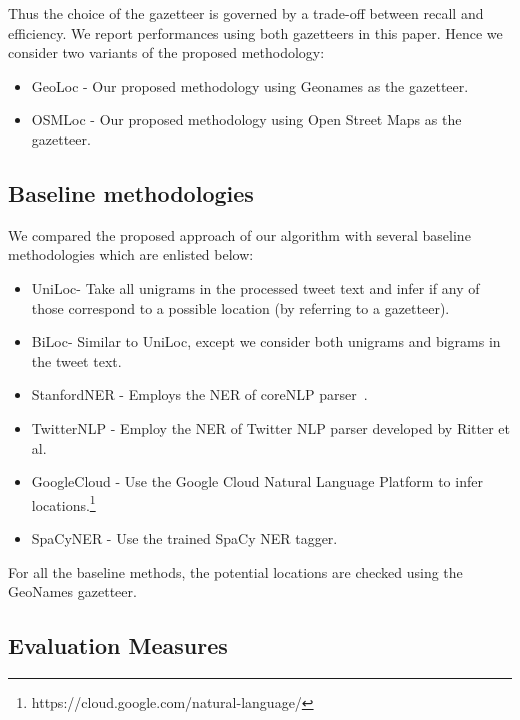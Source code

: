Thus the choice of the gazetteer is governed by a trade-off
between recall and efficiency. 
We report performances using both gazetteers in this paper. Hence we consider two variants of the proposed methodology:
\begin{itemize}
\item GeoLoc - Our proposed methodology using Geonames as the gazetteer. 
\item OSMLoc - Our proposed methodology using Open Street Maps as the gazetteer. 
\end{itemize}



\subsection{Baseline methodologies}

We compared the proposed approach of our algorithm with several baseline methodologies which are enlisted below: 
\begin{itemize}
\item UniLoc- Take all unigrams in the processed tweet text and infer if any of those correspond to a possible location (by referring to a gazetteer). 
\item BiLoc- Similar to UniLoc, except we consider both unigrams and bigrams in the tweet text.
\item StanfordNER - Employs the NER of coreNLP parser~\cite{StanfordNER}. 
\item TwitterNLP - Employ the NER of Twitter NLP parser developed by Ritter et al.~\cite{TwitterNLP1}
\item GoogleCloud - Use the Google Cloud Natural Language Platform to infer locations.\footnote{https://cloud.google.com/natural-language/}
\item SpaCyNER - Use the trained SpaCy NER tagger. 
\end{itemize}	
For all the baseline methods, the potential locations are checked using the GeoNames gazetteer. 


\subsection{Evaluation Measures}

